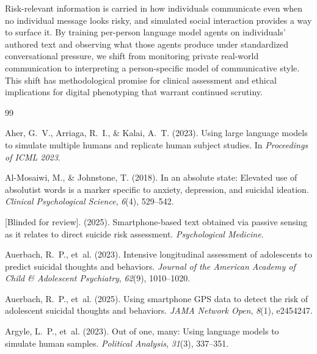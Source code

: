 \documentclass[review,12pt,authoryear]{elsarticle}
\begin{document}
Risk-relevant information is carried in how individuals communicate even when no individual message looks risky, and simulated social interaction provides a way to surface it. By training per-person language model agents on individuals' authored text and observing what those agents produce under standardized conversational pressure, we shift from monitoring private real-world communication to interpreting a person-specific model of communicative style. This shift has methodological promise for clinical assessment and ethical implications for digital phenotyping that warrant continued scrutiny.



\begin{thebibliography}{99}

Aher, G.~V., Arriaga, R.~I., \& Kalai, A.~T. (2023).
\newblock Using large language models to simulate multiple humans and replicate human subject studies.
\newblock In \textit{Proceedings of ICML 2023}.

Al-Mosaiwi, M., \& Johnstone, T. (2018).
\newblock In an absolute state: {E}levated use of absolutist words is a marker specific to anxiety, depression, and suicidal ideation.
\newblock \textit{Clinical Psychological Science}, \textit{6}(4), 529--542.

[Blinded for review]. (2025).
\newblock Smartphone-based text obtained via passive sensing as it relates to direct suicide risk assessment.
\newblock \textit{Psychological Medicine}.

Auerbach, R.~P., et~al. (2023).
\newblock Intensive longitudinal assessment of adolescents to predict suicidal thoughts and behaviors.
\newblock \textit{Journal of the American Academy of Child \& Adolescent Psychiatry}, \textit{62}(9), 1010--1020.

Auerbach, R.~P., et~al. (2025).
\newblock Using smartphone {GPS} data to detect the risk of adolescent suicidal thoughts and behaviors.
\newblock \textit{JAMA Network Open}, \textit{8}(1), e2454247.

Argyle, L.~P., et~al. (2023).
\newblock Out of one, many: {U}sing language models to simulate human samples.
\newblock \textit{Political Analysis}, \textit{31}(3), 337--351.


\end{thebibliography}
\end{document}
